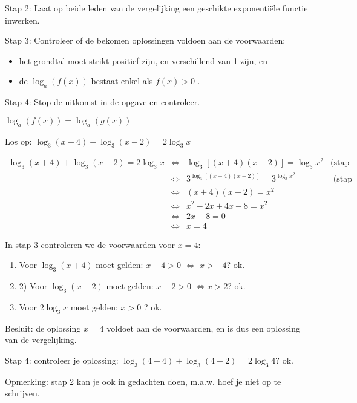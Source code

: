 Stap 2: Laat op beide leden van de vergelijking een geschikte exponenti\"ele
functie inwerken.

Stap 3: Controleer of de bekomen oplossingen voldoen aan de voorwaarden:
\begin{itemize}
	\item het grondtal moet strikt positief zijn, en verschillend van 1 zijn,
	en
	\item de $ \log_{a}\left(f(x)\right)$ bestaat enkel als
	$ f(x)>0$ . 
\end{itemize}
Stap 4: Stop de uitkomst in de opgave en controleer.


\begin{voorbeeld} $\log_{a}\left(f(x)\right)=\log_{a}\left(g(x)\right)$ 

Los op: $ \log_{3}(x+4)+\log_{3}(x-2)=2\log_{3}x$

\begin{equation*} 
\begin{array}{rclr}
\log_{3}(x+4)+\log_{3}(x-2)=2\log_{3}x
	&\iff & \log_{3}\left[\left(x+4\right)\left(x-2\right)\right] = \log_{3}x^{2} & \text{(stap 1)}\\
	&\iff & 3^{\log_{3}\left[\left(x+4\right)\left(x-2\right)\right]} = 3^{\log_{3}x^{2}} & \text{ (stap 2)}\\
	&\iff & \left(x+4\right)\left(x-2\right) = x^{2} & \\
	&\iff & x^{2}-2x+4x-8 = x^{2} & \\
	&\iff & 2x-8 = 0& \\
	&\iff & x = 4 & 
\end{array}
\end{equation*}


In stap 3 controleren we de voorwaarden voor $x=4$:

\begin{enumerate}
	\item Voor $ \log_{3}(x+4)$ moet gelden: $x+4>0$ $\iff$
$x>-4$? ok.
	\item 2) Voor $ \log_{3}(x-2)$ moet gelden: $x-2>0$ $\iff x>2$? ok.
	\item Voor $ 2\log_{3}x$ moet gelden: $x>0$ ? ok.
\end{enumerate}

Besluit: de oplossing $x=4$ voldoet aan de voorwaarden, en is dus
een oplossing van de vergelijking.

Stap 4: controleer je oplossing: $\log_{3}(4+4)+\log_{3}(4-2)=2\log_{3}4$? ok.

Opmerking: stap 2 kan je ook in gedachten doen, m.a.w. hoef je niet
op te schrijven.
\end{voorbeeld}

